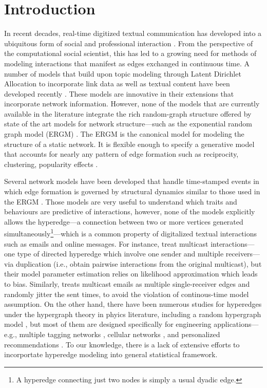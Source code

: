 \documentclass[ba]{imsart}
\numberwithin{equation}{section}
\theoremstyle{plain}
\begin{document}
\section{Introduction}\label{sec:introduction}

In recent decades, real-time digitized textual communication has developed into a ubiquitous form of social and professional interaction \citep{kanungo2008modeling, szostek2011dealing, burgess2004email, pew2016}. From the perspective of the computational social scientist, this has led to a growing need for methods of modeling interactions that manifest as edges exchanged in continuous time. A number of models that build upon topic modeling through Latent Dirichlet Allocation \citep{Blei2003} to incorporate link data as well as textual content have been developed recently \citep{mccallum2005author,lim2013twitter,Krafft2012}. These models are innovative in their extensions that incorporate network information. However, none of the models that are currently available in the literature integrate the rich random-graph structure offered by state of the art models for network structure---such as the exponential random graph model (ERGM) \citep{robins2007introduction,chatterjee2013estimating,hunter2008ergm}. The ERGM is the canonical model for modeling the structure of a static network. It is flexible enough to specify a generative model that accounts for nearly any pattern of edge formation such as reciprocity, clustering, popularity effects \citep{desmarais2017statistical}. 

Several network models have been developed that handle time-stamped events in which edge formation is governed by structural dynamics similar to those used in the ERGM \citep{Butts2008,Vu2011,snijders1996stochastic}. Those models are very useful to understand which traits and behaviours are predictive of interactions, however, none of the models explicitly allows the hyperedge---a connection between two or more vertices generated simultaneously\footnote{A hyperedge connecting just two nodes is simply a usual dyadic edge.}---which is a common property of digitalized textual interactions such as emails and online messages. For instance, \cite{PerryWolfe2012} treat multicast interactions---one type of directed hyperedge which involve one sender and multiple receivers---via duplication (i.e., obtain pairwise interactions from the original multicast), but their model parameter estimation relies on likelihood approximation which leads to bias. Similarly, \cite{fan2009learning} treats multicast emails as multiple single-receiver edges and randomly jitter the sent times, to avoid the violation of continous-time model assumption. On the other hand, there have been numerous studies for hyperedges under the hypergraph theory \citep{karypis1999multilevel} in phyics literature, including a random hypergraph model \citep{ghoshal2009random}, but most of them are designed specifically for engineering applications---e.g., multiple tagging networks \citep{zlatic2009hypergraph,zhang2010hypergraph}, cellular networks \citep{klamt2009hypergraphs}, and personalized recommendations \citep{zhang2010personalized,blattner2009b}. To our knowledge, there is a lack of extensive efforts to incorportate hyperedge modeling into general statistical framework.
\end{document}
